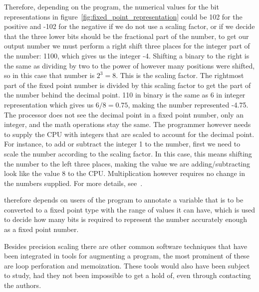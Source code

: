 
Therefore, depending on the program, the numerical values for the bit representations in figure~\ref{fig:fixed_point_representation} could be 102 for the positive and -102 for the negative if we do not use a scaling factor, or if we decide that the three lower bits should be the fractional part of the number, to get our output number we must perform a right shift three places for the integer part of the number: 1100, which gives us the integer -4. Shifting a binary to the right is the same as dividing by two to the power of however many positions were shifted, so in this case that number is $2^3 = 8$. This is the scaling factor. The rightmost part of the fixed point number is divided by this scaling factor to get the part of the number behind the decimal point. 110 in binary is the same as 6 in integer representation which gives us $6/8 = 0.75$, making the number represented -4.75. The processor does not see the decimal point in a fixed point number, only an integer, and the math operations stay the same. The programmer however needs to supply the CPU with integers that are scaled to account for the decimal point. For instance, to add or subtract the integer 1 to the number, first we need to scale the number according to the scaling factor. In this case, this means shifting the number to the left three places, making the value we are adding/subtracting look like the value 8 to the CPU. Multiplication however requires no change in the numbers supplied.  For more details, see~\citet{yates2009fixed}.

\taffo{} therefore depends on users of the program to annotate a variable that is to be converted to a fixed point type with the range of values it can have, which is used to decide how many bits is required to represent the number accurately enough as a fixed point number. 




Besides precision scaling there are other common software techniques that have been integrated in tools for augmenting a program, the most prominent of these are loop perforation and memoization. These tools would also have been subject to study, had they not been impossible to get a hold of, even through contacting the authors. 



